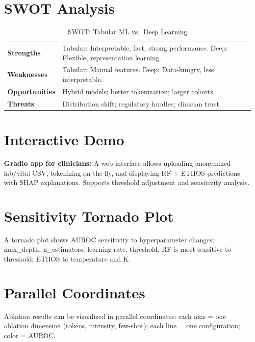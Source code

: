 \section{SWOT Analysis}

\begin{table}[h]
\centering
\caption{SWOT: Tabular ML vs.\ Deep Learning}
\begin{tabular}{ll}
\toprule
\textbf{Strengths} & Tabular: Interpretable, fast, strong performance. Deep: Flexible, representation learning. \\
\textbf{Weaknesses} & Tabular: Manual features. Deep: Data-hungry, less interpretable. \\
\textbf{Opportunities} & Hybrid models; better tokenization; larger cohorts. \\
\textbf{Threats} & Distribution shift; regulatory hurdles; clinician trust. \\
\bottomrule
\end{tabular}
\label{tab:swot}
\end{table}

\section{Interactive Demo}

\textbf{Gradio app for clinicians:} A web interface allows uploading anonymized lab/vital CSV, tokenizing on-the-fly, and displaying RF + ETHOS predictions with SHAP explanations. Supports threshold adjustment and sensitivity analysis.

\section{Sensitivity Tornado Plot}

A tornado plot shows AUROC sensitivity to hyperparameter changes: max\_depth, n\_estimators, learning rate, threshold. RF is most sensitive to threshold; ETHOS to temperature and K.

\section{Parallel Coordinates}

Ablation results can be visualized in parallel coordinates: each axis = one ablation dimension (tokens, intensity, few-shot); each line = one configuration; color = AUROC.
